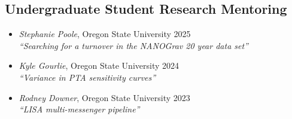 \documentclass[11pt,letterpaper,sans,unicode]{moderncv}
\newcommand{\studentitem}[4]{\item \textit{#1}, {#2} \hfill{#3} \\ \textit{``#4''} } %
\newcommand{\blucirc}{{\color{color1} $\circ\;\;$}}
\begin{document}
{%



\subsection{Undergraduate Student Research Mentoring}
\renewcommand\labelitemi{\blucirc}
\begin{itemize}[leftmargin=8mm]
	\studentitem{Stephanie Poole}{Oregon State University}{2025}{Searching for a turnover in the NANOGrav 20 year data set}
	\studentitem{Kyle Gourlie}{Oregon State University}{2024}{Variance in PTA sensitivity curves}
	\studentitem{Rodney Downer}{Oregon State University}{2023}{LISA multi-messenger pipeline}

\end{itemize}

\begin{comment}

\section{Leadership \& Professional Service}


\end{comment}}
\end{document}
